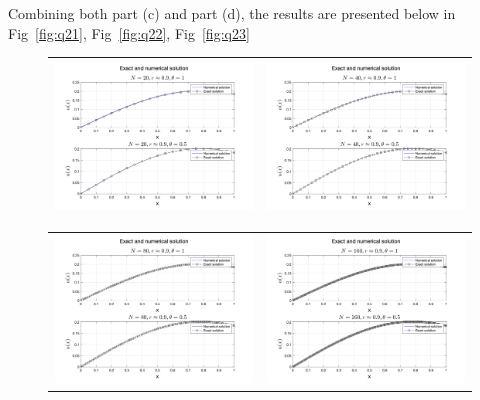 \documentclass[11pt]{article}
\begin{document}
\begin{enumerate}
\begin{enumerate}
      Combining both part (c) and part (d), the results are presented below in Fig~\ref{fig:q21}, Fig~\ref{fig:q22}, Fig~\ref{fig:q23} \\
    \begin{figure}[htp]
    \begin{tabular}{|c|c|}
    \hline
    \includegraphics[width=3.5in]{solN1} & \includegraphics[width=3.5in]{solN2} \\
    \hline
    \end{tabular}
    \begin{tabular}{|c|c|}
    \hline
    \includegraphics[width=3.5in]{solN3} & \includegraphics[width=3.5in]{solN4}\\

\end{tabular}
\end{figure}
\end{enumerate}
\end{enumerate}
\end{document}
